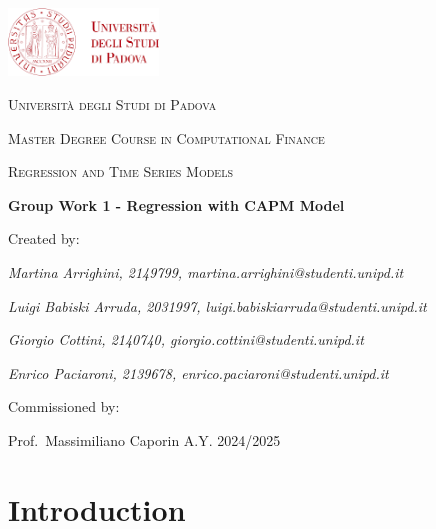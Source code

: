 \documentclass[12pt, openright, oneside]{report}
\begin{document}

    \begin{titlepage}
        \centering
        \includegraphics[width=0.3\textwidth]{images/logo_unipd.png}\par\vspace{1cm}
        {\scshape\LARGE Università degli Studi di Padova \par}
        \vspace{1.5cm}
        {\scshape\Large Master Degree Course in Computational Finance \par}
        \vspace{.2cm}
        {\scshape\large Regression and Time Series Models \par}
        \vspace{2cm}
        {\Large\bfseries Group Work 1 - Regression with CAPM Model\par}
        \vspace{2cm}
        Created by:\par
        {\itshape{Martina Arrighini, 2149799, martina.arrighini@studenti.unipd.it}\par}
        {\itshape{Luigi Babiski Arruda, 2031997, luigi.babiskiarruda@studenti.unipd.it}\par}
        {\itshape{Giorgio Cottini, 2140740, giorgio.cottini@studenti.unipd.it}\par}
        {\itshape{Enrico Paciaroni, 2139678, enrico.paciaroni@studenti.unipd.it}\par}
        \vfill
        Commissioned by:\par
        Prof.\ Massimiliano Caporin
        \vfill
        {\large A.Y. 2024/2025}
    \end{titlepage}

\setcounter{page}{1}

\tableofcontents

\chapter*{Introduction}
\end{document}
